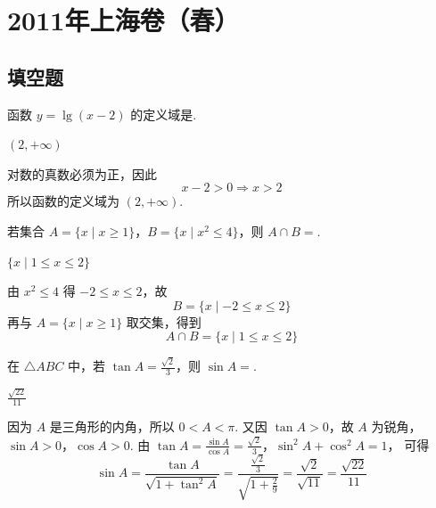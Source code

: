 
\chapter{2011年上海卷（春）}

\section{填空题}

\begin{problem}
函数 \(y=\lg\left(x-2\right)\) 的定义域是\fillinblank{}.
\end{problem}

\begin{answer}
\((2,+\infty)\)
\end{answer}

\begin{solution}
对数的真数必须为正，因此
\[
x-2>0\Longrightarrow x>2
\]
所以函数的定义域为 \((2,+\infty)\).
\end{solution}

\begin{problem}
若集合 \(A = \{x \mid x \geqslant 1\}\)，\(B = \{x \mid x^2 \leqslant 4\}\)，则 \(A \cap B = \)\fillinblank{}.
\end{problem}

\begin{answer}
\(\{x\mid1\le x\le2\}\)
\end{answer}

\begin{solution}
由 \(x^2\le4\) 得 \(-2\le x\le2\)，故
\[
B=\{x\mid-2\le x\le2\}
\]
再与 \(A=\{x\mid x\ge1\}\) 取交集，得到
\[
A\cap B=\{x\mid1\le x\le2\}
\]
\end{solution}

\begin{problem}
在 \(\triangle ABC\) 中，若 \(\tan A = \frac{\sqrt{2}}{3}\)，则 \(\sin A = \)\fillinblank{}.
\end{problem}

\begin{answer}
\(\frac{\sqrt{22}}{11}\)
\end{answer}

\begin{solution}
因为 \(A\) 是三角形的内角，所以 \(0<A<\pi\). 又因 \(\tan A>0\)，故 \(A\) 为锐角，\(\sin A>0\)，\(\cos A>0\). 由
\(\tan A=\frac{\sin A}{\cos A}=\frac{\sqrt{2}}{3}\)，\(\sin^2A+\cos^2A=1\)，
可得
\[
\sin A=\frac{\tan A}{\sqrt{1+\tan^2A}}
 =\frac{\frac{\sqrt{2}}{3}}{\sqrt{1+\frac{2}{9}}}
 =\frac{\sqrt{2}}{\sqrt{11}}=\frac{\sqrt{22}}{11}
\]
\end{solution}

